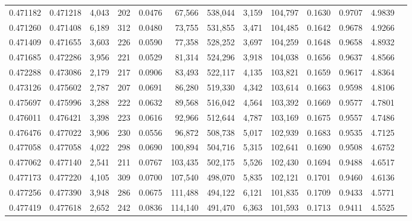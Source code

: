 \begin{tabular}{rrrrrrrrrrrrr}
0.471182 & 0.471218 & 4,043 &   202 &                                     0.0476 &  67,566 & 538,044 &   3,159 & 104,797 & 0.1630 & 0.9707 & 4.9839 \\
0.471260 & 0.471408 & 6,189 &   312 &                                     0.0480 &  73,755 & 531,855 &   3,471 & 104,485 & 0.1642 & 0.9678 & 4.9266 \\
0.471409 & 0.471655 & 3,603 &   226 &                                     0.0590 &  77,358 & 528,252 &   3,697 & 104,259 & 0.1648 & 0.9658 & 4.8932 \\
0.471685 & 0.472286 & 3,956 &   221 &                                     0.0529 &  81,314 & 524,296 &   3,918 & 104,038 & 0.1656 & 0.9637 & 4.8566 \\
0.472288 & 0.473086 & 2,179 &   217 &                                     0.0906 &  83,493 & 522,117 &   4,135 & 103,821 & 0.1659 & 0.9617 & 4.8364 \\
0.473126 & 0.475602 & 2,787 &   207 &                                     0.0691 &  86,280 & 519,330 &   4,342 & 103,614 & 0.1663 & 0.9598 & 4.8106 \\
0.475697 & 0.475996 & 3,288 &   222 &                                     0.0632 &  89,568 & 516,042 &   4,564 & 103,392 & 0.1669 & 0.9577 & 4.7801 \\
0.476011 & 0.476421 & 3,398 &   223 &                                     0.0616 &  92,966 & 512,644 &   4,787 & 103,169 & 0.1675 & 0.9557 & 4.7486 \\
0.476476 & 0.477022 & 3,906 &   230 &                                     0.0556 &  96,872 & 508,738 &   5,017 & 102,939 & 0.1683 & 0.9535 & 4.7125 \\
0.477058 & 0.477058 & 4,022 &   298 &                                     0.0690 & 100,894 & 504,716 &   5,315 & 102,641 & 0.1690 & 0.9508 & 4.6752 \\
0.477062 & 0.477140 & 2,541 &   211 &                                     0.0767 & 103,435 & 502,175 &   5,526 & 102,430 & 0.1694 & 0.9488 & 4.6517 \\
0.477173 & 0.477220 & 4,105 &   309 &                                     0.0700 & 107,540 & 498,070 &   5,835 & 102,121 & 0.1701 & 0.9460 & 4.6136 \\
0.477256 & 0.477390 & 3,948 &   286 &                                     0.0675 & 111,488 & 494,122 &   6,121 & 101,835 & 0.1709 & 0.9433 & 4.5771 \\
0.477419 & 0.477618 & 2,652 &   242 &                                     0.0836 & 114,140 & 491,470 &   6,363 & 101,593 & 0.1713 & 0.9411 & 4.5525 \\

\end{tabular}
